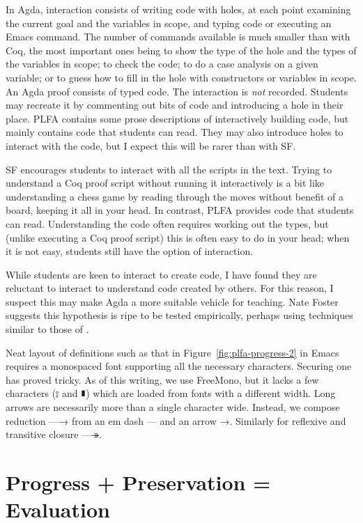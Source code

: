 \documentclass[runningheads]{llncs}
\begin{document}
In Agda, interaction consists of writing code with holes, at each
point examining the current goal and the variables in scope, and
typing code or executing an Emacs command.  The number of commands
available is much smaller than with Coq, the most important ones being
to show the type of the hole and the types of the variables in scope;
to check the code; to do a case analysis on a given variable; or to
guess how to fill in the hole with constructors or variables in scope.
An Agda proof consists of typed code.  The interaction is \emph{not}
recorded.  Students may recreate it by commenting out bits of code and
introducing a hole in their place.   PLFA contains some prose descriptions
of interactively building code, but mainly contains code that students
can read.  They may also introduce holes to interact with the code, but
I expect this will be rarer than with SF.

SF encourages students to interact with all the scripts in the text.
Trying to understand a Coq proof script without running it
interactively is a bit like understanding a chess game by reading
through the moves without benefit of a board, keeping it all in your
head.  In contrast, PLFA provides code that students can read.
Understanding the code often requires working out the types, but
(unlike executing a Coq proof script) this is often easy to do in your
head; when it is not easy, students still have the option of
interaction.

While students are keen to interact to create code, I have found they
are reluctant to interact to understand code created by others. For
this reason, I suspect this may make Agda a more suitable vehicle for
teaching.  Nate Foster suggests this hypothesis is ripe to be tested
empirically, perhaps using techniques similar to those of
\citet{Danas-et-al-2017}.

Neat layout of definitions such as that in
Figure~\ref{fig:plfa-progress-2} in Emacs requires a monospaced font
supporting all the necessary characters.  Securing one has proved
tricky. As of this writing, we use FreeMono, but it lacks a few
characters (⦂ and ∎) which are loaded from fonts with a different
width.  Long arrows are necessarily more than a single character wide.
Instead, we compose reduction —→ from an em dash — and an arrow →.
Similarly for reflexive and transitive closure —↠.

\section{Progress + Preservation = Evaluation}
\end{document}

